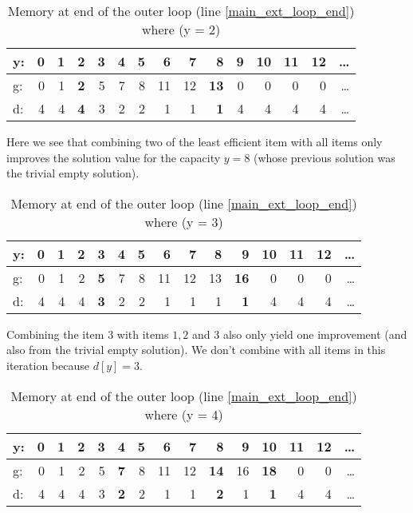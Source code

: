 \documentclass[12pt]{article}
\begin{document}
\begin{table}[h]
\centering
\caption{Memory at end of the outer loop (line \ref{main_ext_loop_end}) where (y = 2)}
\label{mem_y_2}
\begin{tabular}{l|rrrrrrrrrrrrrr}
y: & 0 &1 &\textbf{2} &3 &4 &5 &6 &7 &8 &9 &10 &11 &12 &\dots\\
\hline
g: & 0 &1 &\textbf{2} &5 &7 &8 &11 &12 &\textbf{13} &0 &0 &0 &0 &\dots\\
d: & 4 & 4 &\textbf{4} & 3 & 2 & 2 & 1 & 1 & \textbf{1} & 4 & 4 & 4 & 4 & \dots\\
\end{tabular}
\end{table}

Here we see that combining two of the least efficient item with all items only improves the solution value for the capacity \(y = 8\) (whose previous solution was the trivial empty solution).

\pagebreak
\begin{table}[H]
\centering
\caption{Memory at end of the outer loop (line \ref{main_ext_loop_end}) where (y = 3)}
\label{mem_y_3}
\begin{tabular}{l|rrrrrrrrrrrrrr}
y: & 0 &1 &2 & \textbf{3} &4 &5 &6 &7 &8 &9 &10 &11 &12 &\dots\\
\hline
g: & 0 &1 &2 & \textbf{5} &7 &8 &11 &12 &13 &\textbf{16} &0 &0 &0 &\dots\\
d: & 4 & 4 & 4 & \textbf{3} & 2 & 2 & 1 & 1 & 1 & \textbf{1} & 4 & 4 & 4 & \dots\\
\end{tabular}
\end{table}

Combining the item \(3\) with items \(1, 2\) and \(3\) also only yield one improvement (and also from the trivial empty solution). We don't combine with all items in this iteration because \(d[y] = 3\).

\begin{table}[H]
\centering
\caption{Memory at end of the outer loop (line \ref{main_ext_loop_end}) where (y = 4)}
\label{mem_y_4}
\begin{tabular}{l|rrrrrrrrrrrrrr}
y: & 0 &1 &2 &3 &\textbf{4} &5 &6 &7 &\textbf{8} &9 &\textbf{10} &11 &12 &\dots\\
\hline
g: & 0 &1 &2 &5 &\textbf{7} &8 &11 &12 &\textbf{14} &16 &\textbf{18} &0 &0 &\dots\\
d: & 4 & 4 & 4 & 3 & \textbf{2} & 2 & 1 & 1 & \textbf{2} & 1 & \textbf{1} & 4 & 4 & \dots\\
\end{tabular}
\end{table}
\end{document}
